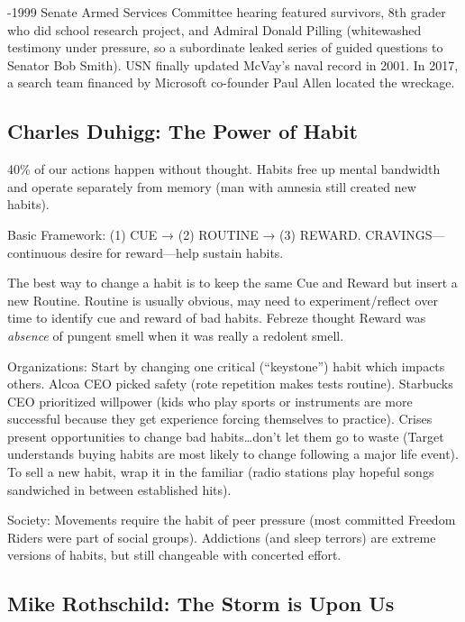 \documentclass[
]{article}
\begin{document}
-1999 Senate Armed Services Committee hearing featured survivors, 8th
grader who did school research project, and Admiral Donald Pilling
(whitewashed testimony under pressure, so a subordinate leaked series of
guided questions to Senator Bob Smith). USN finally updated McVay's
naval record in 2001. In 2017, a search team financed by Microsoft
co-founder Paul Allen located the wreckage.

\hypertarget{charles-duhigg-the-power-of-habit}{%
\subsection{Charles Duhigg: The Power of
Habit}\label{charles-duhigg-the-power-of-habit}}

40\% of our actions happen without thought. Habits free up mental
bandwidth and operate separately from memory (man with amnesia still
created new habits).

Basic Framework: (1) CUE → (2) ROUTINE → (3) REWARD.
CRAVINGS---continuous desire for reward---help sustain habits.

The best way to change a habit is to keep the same Cue and Reward but
insert a new Routine. Routine is usually obvious, may need to
experiment/reflect over time to identify cue and reward of bad habits.
Febreze thought Reward was \emph{absence} of pungent smell when it was
really a redolent smell.

Organizations: Start by changing one critical (``keystone'') habit which
impacts others. Alcoa CEO picked safety (rote repetition makes tests
routine). Starbucks CEO prioritized willpower (kids who play sports or
instruments are more successful because they get experience forcing
themselves to practice). Crises present opportunities to change bad
habits\ldots don't let them go to waste (Target understands buying
habits are most likely to change following a major life event). To sell
a new habit, wrap it in the familiar (radio stations play hopeful songs
sandwiched in between established hits).

Society: Movements require the habit of peer pressure (most committed
Freedom Riders were part of social groups). Addictions (and sleep
terrors) are extreme versions of habits, but still changeable with
concerted effort.

\hypertarget{mike-rothschild-the-storm-is-upon-us}{%
\subsection{Mike Rothschild: The Storm is Upon
Us}\label{mike-rothschild-the-storm-is-upon-us}}
\end{document}
